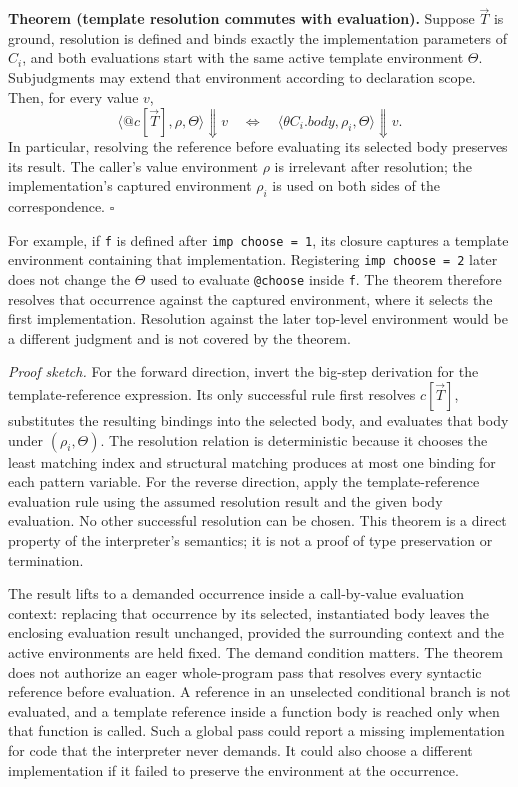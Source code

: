 \documentclass[11pt]{article}
\begin{document}
\medskip
\noindent\textbf{Theorem (template resolution commutes with evaluation).}
Suppose \(\vec T\) is ground, resolution is defined and binds exactly the
implementation parameters of \(C_i\), and both evaluations start with the
same active template environment \(\Theta\). Subjudgments may extend that
environment according to declaration scope. Then, for every value \(v\),
\[
  \langle\texttt{@}c[\vec T],\rho,\Theta\rangle\Downarrow v
  \quad\Longleftrightarrow\quad
  \langle\theta C_i.\mathit{body},\rho_i,\Theta\rangle\Downarrow v.
\]
In particular, resolving the reference before evaluating its selected body
preserves its result. The caller's value environment \(\rho\) is irrelevant
after resolution; the implementation's captured environment \(\rho_i\) is
used on both sides of the correspondence. \hfill\(\square\)

For example, if \texttt{f} is defined after \texttt{imp choose = 1}, its
closure captures a template environment containing that implementation.
Registering \texttt{imp choose = 2} later does not change the \(\Theta\)
used to evaluate \texttt{@choose} inside \texttt{f}. The theorem therefore
resolves that occurrence against the captured environment, where it selects
the first implementation. Resolution against the later top-level environment
would be a different judgment and is not covered by the theorem.

\noindent\emph{Proof sketch.} For the forward direction, invert the big-step
derivation for the template-reference expression. Its only successful rule
first resolves \(c[\vec T]\), substitutes the resulting bindings into the
selected body, and evaluates that body under \((\rho_i,\Theta)\). The
resolution relation is deterministic because it chooses the least matching
index and structural matching produces at most one binding for each pattern
variable. For the reverse direction, apply the template-reference evaluation
rule using the assumed resolution result and the given body evaluation. No
other successful resolution can be chosen. This theorem is a direct property
of the interpreter's semantics; it is not a proof of type preservation or
termination.\par

The result lifts to a demanded occurrence inside a call-by-value evaluation
context: replacing that occurrence by its selected, instantiated body leaves
the enclosing evaluation result unchanged, provided the surrounding context
and the active environments are held fixed. The demand condition matters.
The theorem does not authorize an eager whole-program pass that resolves
every syntactic reference before evaluation. A reference in an unselected
conditional branch is not evaluated, and a template reference inside a
function body is reached only when that function is called. Such a global
pass could report a missing implementation for code that the interpreter
never demands. It could also choose a different implementation if it failed
to preserve the environment at the occurrence.
\end{document}
